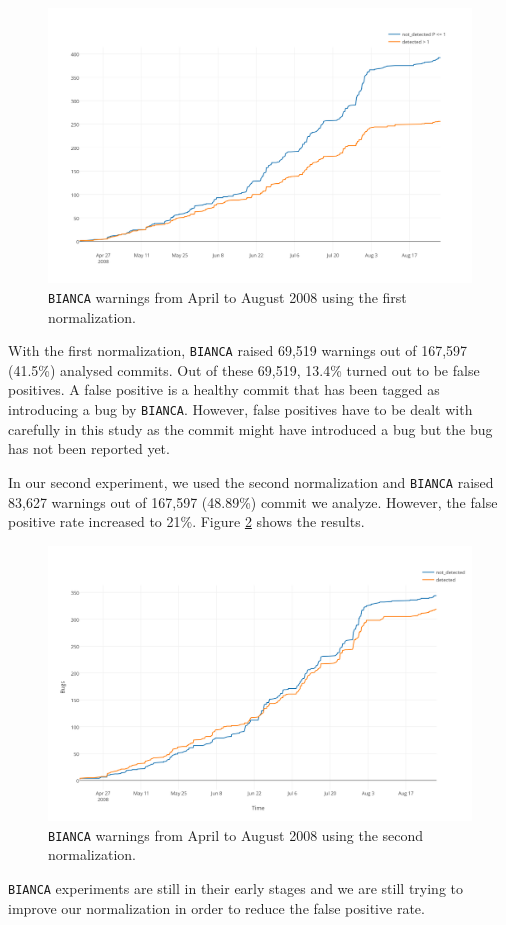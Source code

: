 \begin{figure}[h!]
  \centering
    \includegraphics[scale=0.55]{media/bianca-13.png}
    \caption{{\tt BIANCA} warnings from April to August 2008 using the first normalization.
    \label{fig:bianca-exp-1}}
\end{figure}

With the first normalization, {\tt BIANCA} raised 69,519 warnings out of 167,597 (41.5\%) analysed commits.
Out of these 69,519, 13.4\% turned out to be false positives. A false positive is a healthy commit that has been tagged as introducing a bug by {\tt BIANCA}.
However, false positives have to be dealt with carefully in this study as the commit might have introduced a bug but the bug has not been reported yet.

In our second experiment, we used the second normalization and {\tt BIANCA} raised 83,627 warnings out of 167,597 (48.89\%) commit we analyze. However, the false positive rate increased to 21\%. Figure \ref{fig:bianca-exp-2} shows the results.

\begin{figure}[h!]
  \centering
    \includegraphics[scale=0.55]{media/bianca-20.png}
    \caption{{\tt BIANCA} warnings from April to August 2008 using the second normalization.
    \label{fig:bianca-exp-2}}
\end{figure}

{\tt BIANCA} experiments are still in their early stages and we are still trying to improve our normalization in order to reduce the false positive rate.
